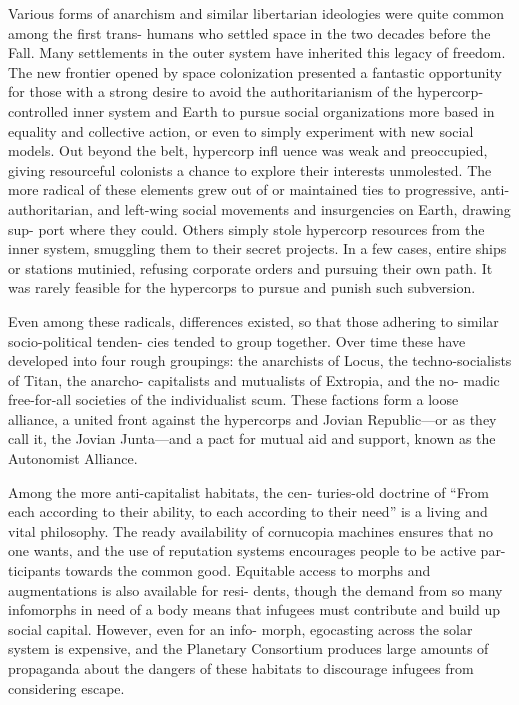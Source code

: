 Various forms of anarchism and similar libertarian 
ideologies were quite common among the first trans-
humans who settled space in the two decades before 
the Fall. Many settlements in the outer system have 
inherited this legacy of freedom. The new frontier 
opened by space colonization presented a fantastic 
opportunity for those with a strong desire to avoid 
the authoritarianism of the hypercorp-controlled 
inner system and Earth to pursue social organizations 
more based in equality and collective action, or even 
to simply experiment with new social models. Out 
beyond the belt, hypercorp infl uence was weak and 
preoccupied, giving resourceful colonists a chance to 
explore their interests unmolested. The more radical 
of these elements grew out of or maintained ties to 
progressive, anti-authoritarian, and left-wing social 
movements and insurgencies on Earth, drawing sup-
port where they could. Others simply stole hypercorp 
resources from the inner system, smuggling them 
to their secret projects. In a few cases, entire ships 
or stations mutinied, refusing corporate orders and 
pursuing their own path. It was rarely feasible for the 
hypercorps to pursue and punish such subversion.

Even among these radicals, differences existed, so 
that those adhering to similar socio-political tenden-
cies tended to group together. Over time these have 
developed into four rough groupings: the anarchists 
of Locus, the techno-socialists of Titan, the anarcho-
capitalists and mutualists of Extropia, and the no-
madic free-for-all societies of the individualist scum. 
These factions form a loose alliance, a united front 
against the hypercorps and Jovian Republic—or as 
they call it, the Jovian Junta—and a pact for mutual 
aid and support, known as the Autonomist Alliance.

Among the more anti-capitalist habitats, the cen-
turies-old doctrine of ``From each according to their 
ability, to each according to their need'' is a living and 
vital philosophy. The ready availability of cornucopia 
machines ensures that no one wants, and the use of 
reputation systems encourages people to be active par-
ticipants towards the common good. Equitable access 
to morphs and augmentations is also available for resi-
dents, though the demand from so many infomorphs 
in need of a body means that infugees must contribute 
and build up social capital. However, even for an info-
morph, egocasting across the solar system is expensive, 
and the Planetary Consortium produces large amounts 
of propaganda about the dangers of these habitats to 
discourage infugees from considering escape.


